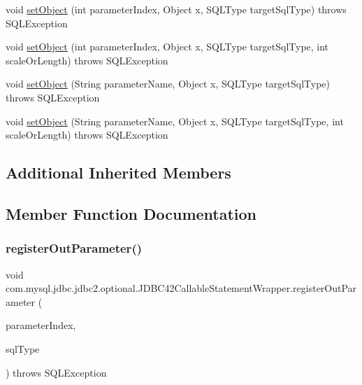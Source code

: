 \begin{DoxyCompactItemize}
\item 
void \mbox{\hyperlink{classcom_1_1mysql_1_1jdbc_1_1jdbc2_1_1optional_1_1_j_d_b_c42_callable_statement_wrapper_a6347e6831937847fbc805efc8acddc19}{set\+Object}} (int parameter\+Index, Object x, S\+Q\+L\+Type target\+Sql\+Type)  throws S\+Q\+L\+Exception 
\item 
void \mbox{\hyperlink{classcom_1_1mysql_1_1jdbc_1_1jdbc2_1_1optional_1_1_j_d_b_c42_callable_statement_wrapper_a2420a6e7fd889124096c56d2d58342a2}{set\+Object}} (int parameter\+Index, Object x, S\+Q\+L\+Type target\+Sql\+Type, int scale\+Or\+Length)  throws S\+Q\+L\+Exception 
\item 
void \mbox{\hyperlink{classcom_1_1mysql_1_1jdbc_1_1jdbc2_1_1optional_1_1_j_d_b_c42_callable_statement_wrapper_a3f73c4e6c680f1551160fc8298ec93dc}{set\+Object}} (String parameter\+Name, Object x, S\+Q\+L\+Type target\+Sql\+Type)  throws S\+Q\+L\+Exception 
\item 
void \mbox{\hyperlink{classcom_1_1mysql_1_1jdbc_1_1jdbc2_1_1optional_1_1_j_d_b_c42_callable_statement_wrapper_ace477cb92979b7e93e698fdb641d43f0}{set\+Object}} (String parameter\+Name, Object x, S\+Q\+L\+Type target\+Sql\+Type, int scale\+Or\+Length)  throws S\+Q\+L\+Exception 
\end{DoxyCompactItemize}
\subsection*{Additional Inherited Members}


\subsection{Member Function Documentation}
\mbox{\label{classcom_1_1mysql_1_1jdbc_1_1jdbc2_1_1optional_1_1_j_d_b_c42_callable_statement_wrapper_ad3f62b1f3c34747abd90a3699a898125}} 
\subsubsection{\texorpdfstring{register\+Out\+Parameter()}{registerOutParameter()}\hspace{0.1cm}{\footnotesize\ttfamily [1/6]}}
{\footnotesize\ttfamily void com.\+mysql.\+jdbc.\+jdbc2.\+optional.\+J\+D\+B\+C42\+Callable\+Statement\+Wrapper.\+register\+Out\+Parameter (\begin{DoxyParamCaption}\item[{int}]{parameter\+Index,  }\item[{S\+Q\+L\+Type}]{sql\+Type }\end{DoxyParamCaption}) throws S\+Q\+L\+Exception}

